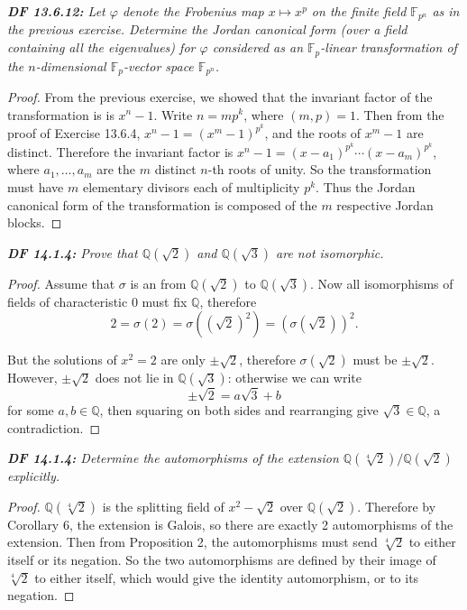 \documentclass{article}
\begin{document}
\it \textbf{DF 13.6.12:} Let $\varphi$ denote the Frobenius map $x\mapsto
  x^p$ on the finite field $\mathbb{F}_{p^n}$ as in the previous exercise.
  Determine the Jordan canonical form (over a field containing all the
  eigenvalues) for $\varphi$ considered as an $\mathbb{F}_p$-linear
  transformation of the $n$-dimensional $\mathbb{F}_p$-vector space
  $\mathbb{F}_{p^n}$.

  \begin{proof}
    From the previous exercise, we showed that the invariant factor
    of the transformation is is $x^n-1$. Write $n=mp^k$, where $(m,p)=1$.
    Then from the proof of Exercise 13.6.4, $x^n-1=(x^m-1)^{p^k}$, and the
    roots of $x^m-1$ are distinct. Therefore the invariant factor is
    $x^n-1 =(x-a_1)^{p^k}\cdots(x-a_m)^{p^k}$, where $a_1,\ldots,a_m$ are
    the $m$ distinct $n$-th roots of unity. So the transformation must have
    $m$ elementary divisors each of multiplicity $p^k$. Thus the Jordan
    canonical form of the transformation is composed of the $m$ respective
    Jordan blocks.
  \end{proof}

\it \textbf{DF 14.1.4:} Prove that $\mathbb{Q}(\sqrt{2})$ and
  $\mathbb{Q}(\sqrt{3})$ are not isomorphic.

  \begin{proof}
    Assume that $\sigma$ is an from $\mathbb{Q}(\sqrt{2})$ to
    $\mathbb{Q}(\sqrt{3})$. Now all isomorphisms of fields of
    characteristic 0 must fix $\mathbb{Q}$, therefore
    \[2=\sigma(2) =\sigma((\sqrt{2})^2) =(\sigma(\sqrt{2}))^2.\]

    But the solutions of $x^2=2$ are only $\pm\sqrt{2}$, therefore
    $\sigma(\sqrt{2})$ must be $\pm\sqrt{2}$. However, $\pm\sqrt{2}$ does
    not lie in $\mathbb{Q}(\sqrt{3})$: otherwise we can write
    \[\pm\sqrt{2} =a\sqrt{3}+b\]
    for some $a,b\in\mathbb{Q}$, then squaring on both sides and
    rearranging give $\sqrt{3}\in\mathbb{Q}$, a contradiction.
  \end{proof}

\it \textbf{DF 14.1.4:} Determine the automorphisms of the extension
  $\mathbb{Q}(\sqrt[4]{2})/\mathbb{Q}(\sqrt{2})$ explicitly.

  \begin{proof}
    $\mathbb{Q}(\sqrt[4]{2})$ is the splitting field of $x^2-\sqrt{2}$ over
    $\mathbb{Q}(\sqrt{2})$. Therefore by Corollary 6, the extension is
    Galois, so there are exactly 2 automorphisms of the extension. Then
    from Proposition 2, the automorphisms must send $\sqrt[4]{2}$ to either
    itself or its negation. So the two automorphisms are defined by their
    image of  $\sqrt[4]{2}$ to either itself, which would give the identity
    automorphism, or to its negation.
  \end{proof}
\end{document}
